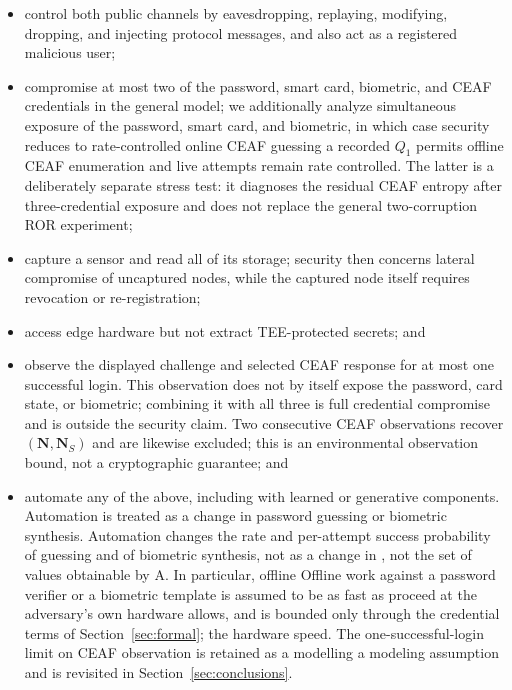 \documentclass[cmc,article,submit,moreauthors,pdftex]{Definitions/tsp}
\renewcommand{\mathcal}[1]{\mathrm{#1}}
\newcommand{\advA}{\mathcal{A}}
\providecommand{\DIFadd}[1]{{\protect\color{blue} \sf #1}} %
\providecommand{\DIFdel}[1]{{\protect\color{red} \scriptsize #1}} %
\providecommand{\DIFaddbegin}{} %
\providecommand{\DIFaddend}{} %
\providecommand{\DIFdelbegin}{} %
\providecommand{\DIFdelend}{} %
\begin{document}
\begin{itemize}
\item control both public channels by eavesdropping, replaying, modifying, dropping, and injecting protocol messages, and also act as a registered malicious user;
\item compromise at most two of the password, smart card, biometric, and CEAF credentials in the general model; we additionally analyze simultaneous exposure of the password, smart card, and biometric, in which case \DIFdelbegin \DIFdel{security reduces to rate-controlled online CEAF guessing}\DIFdelend \DIFaddbegin \DIFadd{a recorded $Q_1$ permits offline CEAF enumeration and live attempts remain rate controlled. The latter is a deliberately separate stress test: it diagnoses the residual CEAF entropy after three-credential exposure and does not replace the general two-corruption ROR experiment}\DIFaddend ;
\item capture a sensor and read all of its storage; security then concerns lateral compromise of uncaptured nodes, while the captured node itself requires revocation or re-registration;
\item access edge hardware but not extract TEE-protected secrets; and
\item observe the displayed challenge and selected CEAF response for at most one successful login. This observation does not by itself expose the password, card state, or biometric; combining it with all three is full credential compromise and is outside the security claim. Two consecutive CEAF observations recover $(\mathbf{N},\mathbf{N}_S)$ and are likewise excluded; \DIFaddbegin \DIFadd{this is an environmental observation bound, not a cryptographic guarantee; }\DIFaddend and
\item automate \DIFdelbegin \DIFdel{any of the above, including with learned or generative components. Automation is treated as a change in }\DIFdelend \DIFaddbegin \DIFadd{password guessing or biometric synthesis. Automation changes }\DIFaddend the rate and per-attempt success probability\DIFdelbegin \DIFdel{of guessing and of biometric synthesis, not as a change in }\DIFdelend \DIFaddbegin \DIFadd{, not }\DIFaddend the set of values obtainable by $\advA$. \DIFdelbegin \DIFdel{In particular, offline }\DIFdelend \DIFaddbegin \DIFadd{Offline }\DIFaddend work against a password verifier or \DIFdelbegin \DIFdel{a }\DIFdelend biometric template is assumed to \DIFdelbegin \DIFdel{be as fast as }\DIFdelend \DIFaddbegin \DIFadd{proceed at }\DIFaddend the adversary's \DIFdelbegin \DIFdel{own hardware allows, and is bounded only through the credential terms of Section~\ref{sec:formal}; the }\DIFdelend \DIFaddbegin \DIFadd{hardware speed. The }\DIFaddend one-successful-login limit on CEAF observation is \DIFdelbegin \DIFdel{retained as a modelling }\DIFdelend \DIFaddbegin \DIFadd{a modeling }\DIFaddend assumption and is revisited in Section~\ref{sec:conclusions}.
\end{itemize}
\end{document}
